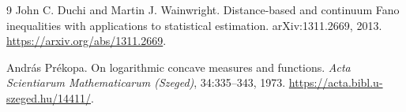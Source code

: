 \documentclass[11pt,a4paper]{article}
\theoremstyle{definition}
\theoremstyle{remark}
\begin{document}
\begin{thebibliography}{9}
John C. Duchi and Martin J. Wainwright.
\newblock Distance-based and continuum Fano inequalities with applications to statistical estimation.
\newblock arXiv:1311.2669, 2013.
\newblock \url{https://arxiv.org/abs/1311.2669}.

Andr\'as Pr\'ekopa.
\newblock On logarithmic concave measures and functions.
\newblock \emph{Acta Scientiarum Mathematicarum (Szeged)}, 34:335--343, 1973.
\newblock \url{https://acta.bibl.u-szeged.hu/14411/}.
\end{thebibliography}
\end{document}
